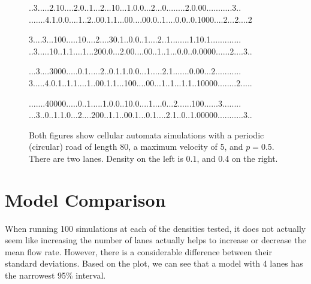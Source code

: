 \documentclass{article}
\begin{document}
\begin{figure}[h]
\begin{minipage}[t]{.5\textwidth}
..3.....2.10....2.0..1...2...10...1.0.0...2...0........2.0.00...........3..
.......4.1.0.0....1..2..00.1.1...00....00.0..1....0.0..0.1000....2...2....2

3....3...100.....10....2....30.1..0.0..1....2..1........1.10.1.............
..3.....10..1.1....1...200.0...2.00....00..1..1...0.0..0.0000......2....3..

...3....3000.....0.1.....2..0.1.1.0.0...1.....2.1.......0.00...2...........
3.....4.0.1..1.1....1..00.1.1...100....00...1..1...1.1..10000........2.....

.......40000.....0..1.....1.0.0..10.0....1....0...2......100......3........
...3..0..1.1.0...2....200..1.1..00.1...0.1....2.1..0..1.00000...........3..
\end{minipage}

\caption{Both figures show cellular automata simulations with a periodic (circular) road of length 80, a maximum velocity of 5, and $p = 0.5$. There are two lanes. Density on the left is $0.1$, and 0.4 on the right.}
\end{figure}










\newpage

\section*{Model Comparison}
When running 100 simulations at each of the densities tested, it does not actually seem like increasing the number of lanes actually helps to increase or decrease the mean flow rate. However, there is a considerable difference between their standard deviations. Based on the plot, we can see that a model with 4 lanes has the narrowest 95\% interval.\\
\end{document}
